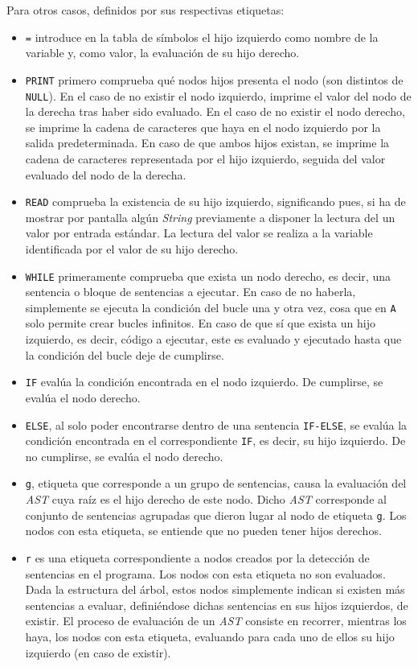 \documentclass[12pt]{article}
\begin{document}
Para otros casos, definidos por sus respectivas etiquetas:
\begin{itemize}
    \item \texttt{=} introduce en la tabla de símbolos el hijo izquierdo como nombre de la variable y, como valor, la evaluación de su hijo derecho.
    \item \texttt{PRINT} primero comprueba qué nodos hijos presenta el nodo (son distintos de \texttt{NULL}). En el caso de no existir el nodo izquierdo, imprime el valor del nodo de la derecha tras haber sido evaluado. En el caso de no existir el nodo derecho, se imprime la cadena de caracteres que haya en el nodo izquierdo por la salida predeterminada. En caso de que ambos hijos existan, se imprime la cadena de caracteres representada por el hijo izquierdo, seguida del valor evaluado del nodo de la derecha.
    \item  \texttt{READ} comprueba la existencia de su hijo izquierdo, significando pues, si ha de mostrar por pantalla algún \textit{String} previamente a disponer la lectura del un valor por entrada estándar. La lectura del valor se realiza a la variable identificada por el valor de su hijo derecho.
    \item \texttt{WHILE} primeramente comprueba que exista un nodo derecho, es decir, una sentencia o bloque de sentencias a ejecutar. En caso de no haberla, simplemente se ejecuta la condición del bucle una y otra vez, cosa que en \texttt{A} solo permite crear bucles infinitos. En caso de que sí que exista un hijo izquierdo, es decir, código a ejecutar, este es evaluado y ejecutado hasta que la condición del bucle deje de cumplirse.
    \item  \texttt{IF} evalúa la condición encontrada en el nodo izquierdo. De cumplirse, se evalúa el nodo derecho.
    \item  \texttt{ELSE}, al solo poder encontrarse dentro de una sentencia \texttt{IF-ELSE}, se evalúa la condición encontrada en el correspondiente \texttt{IF}, es decir, su hijo izquierdo. De no cumplirse, se evalúa el nodo derecho.
    \item \texttt{g}, etiqueta que corresponde a un grupo de sentencias, causa la evaluación del \textit{AST} cuya raíz es el hijo derecho de este nodo. Dicho \textit{AST} corresponde al conjunto de sentencias agrupadas que dieron lugar al nodo de etiqueta \texttt{g}. Los nodos con esta etiqueta, se entiende que no pueden tener hijos derechos.
    \item \texttt{r} es una etiqueta correspondiente a nodos creados por la detección de sentencias en el programa. Los nodos con esta etiqueta no son evaluados. Dada la estructura del árbol, estos nodos simplemente indican si existen más sentencias a evaluar, definiéndose dichas sentencias en sus hijos izquierdos, de existir. El proceso de evaluación de un \textit{AST} consiste en recorrer, mientras los haya, los nodos con esta etiqueta, evaluando para cada uno de ellos su hijo izquierdo (en caso de existir).
\end{itemize}
    
\end{document}
